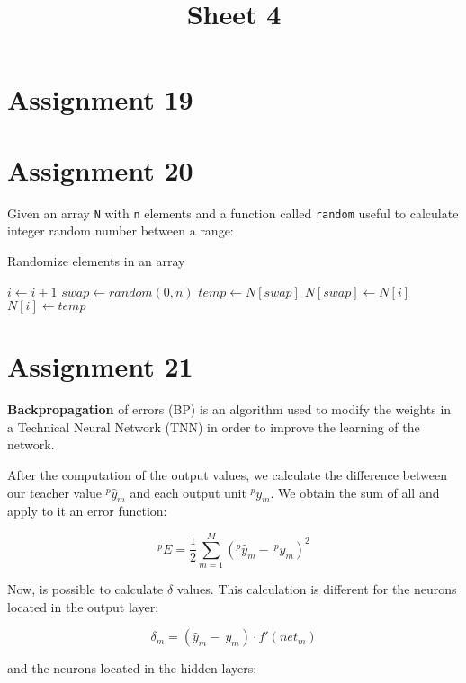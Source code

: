 \documentclass[12pt]{article}
\begin{document}
 
\title{Sheet 4} 
\maketitle
 
\section{Assignment 19}

\section{Assignment 20}

Given an array \texttt{N} with \texttt{n} elements and a function called
\texttt{random} useful to calculate integer random number between a range:

\begin{algorithm}
\caption*{Randomize elements in an array}
    \begin{algorithmic}[1]
            \State $i\gets i + 1$
            \State $swap\gets random(0, n)$
            \State $temp\gets N[swap]$
            \State $N[swap]\gets N[i]$
            \State $N[i]\gets temp$
        \EndFor
    \end{algorithmic}
\end{algorithm}

\section{Assignment 21}

\textbf{Backpropagation} of errors (BP) is an algorithm used to modify the
weights in a Technical Neural Network (TNN) in order to improve the learning of
the network. 

After the computation of the output values, we calculate the difference between
our teacher value $^{p}{\hat{y}}_{m}$ and each output unit $^{p}y_{m}$. We
obtain the sum of all and apply to it an error function:

$$ ^{p}E = \frac{1}{2} \sum_{m=1}^{M} (^{p}{\hat{y}}_{m} -\: ^{p}y_{m})^2 $$

Now, is possible to calculate $\delta$ values. This calculation is different
for the neurons located in the output layer: 

$$\delta_{m} = ( \hat{y}_{m} -\: y_{m}) \cdot f'(net_{m})$$

and the neurons located in the hidden layers: 
\end{document}
